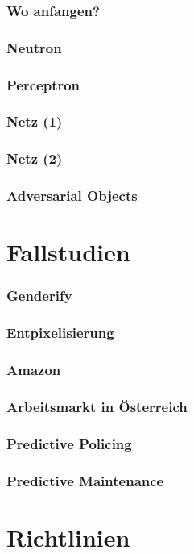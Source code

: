 \documentclass[aspectratio=169,xcolor=dvipsnames]{beamer}
\begin{document}
\begin{frame}
\frametitle{Wo anfangen?}
\end{frame}

\begin{frame}
\frametitle{Neutron}
\end{frame}

\begin{frame}
\frametitle{Perceptron}
\end{frame}

\begin{frame}
\frametitle{Netz (1)}
\end{frame}

\begin{frame}
\frametitle{Netz (2)}
\end{frame}

\begin{frame}
\frametitle{Adversarial Objects}
\end{frame}


\section{Fallstudien}

\begin{frame}
\frametitle{Genderify}
\end{frame}

\begin{frame}
\frametitle{Entpixelisierung}
\end{frame}

\begin{frame}
\frametitle{Amazon}
\end{frame}

\begin{frame}
\frametitle{Arbeitsmarkt in Österreich}
\end{frame}

\begin{frame}
\frametitle{Predictive Policing}
\end{frame}

\begin{frame}
\frametitle{Predictive Maintenance}
\end{frame}

\section{Richtlinien}
\end{document}

